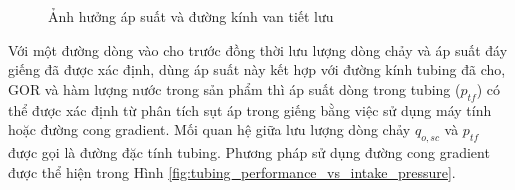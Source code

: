 \documentclass[12pt,a4paper]{report}
\begin{document}
	\begin{figure}[h]
		\centering
		\hfill
		\hfill
		\caption[Ảnh hưởng áp suất và đường kính van tiết lưu]{Ảnh hưởng áp suất và đường kính van tiết lưu \cite{jansen2004modelling}}
	\end{figure}

Với một đường dòng vào cho trước đồng thời lưu lượng dòng chảy và áp suất đáy giếng đã được xác định, dùng áp suất này kết hợp với đường kính tubing đã cho, GOR và hàm lượng nước trong sản phẩm thì áp suất dòng trong tubing ($p_{tf}$) có thể được xác định từ phân tích sụt áp trong giếng bằng việc sử dụng máy tính hoặc đường cong gradient. Mối quan hệ giữa lưu lượng dòng chảy $q_{o,sc}$ và $p_{tf}$ được gọi là đường đặc tính tubing. Phương pháp sử dụng đường cong gradient được thể hiện trong Hình \ref{fig:tubing_performance_vs_intake_pressure}.
\end{document}
